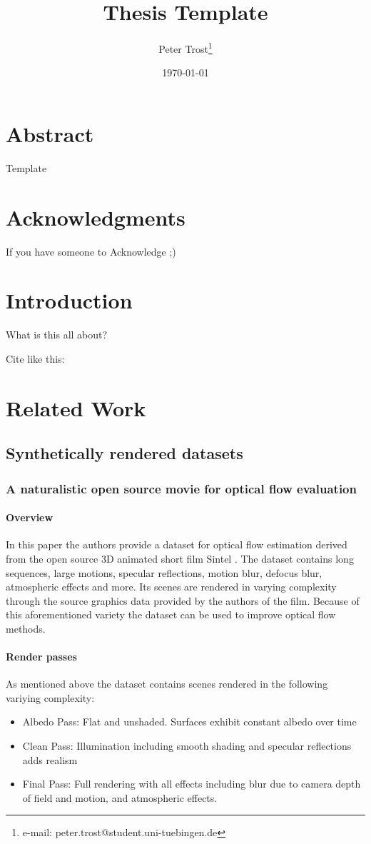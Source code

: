 \documentclass[a4paper,cleardoubleempty,BCOR1cm]{scrbook}
\title{Thesis Template}
\author{Peter Trost\thanks{e-mail: peter.trost@student.uni-tuebingen.de}}
\date{\today}
\begin{document}


\chapter*{Abstract}
Template

\chapter*{Acknowledgments}
If you have someone to Acknowledge ;)

\tableofcontents


\chapter{Introduction}
What is this all about?

Cite like this: \cite{agarwal2011}

\chapter{Related Work}
\section{Synthetically rendered datasets}
\subsection{A naturalistic open source movie for optical flow evaluation}
\cite{Butler:ECCV:2012}
\subsubsection{Overview}
In this paper the authors provide a dataset for optical flow estimation derived from the open source 3D animated short film Sintel
.
The dataset contains long sequences, large motions, specular reflections, motion blur, defocus blur, atmospheric effects and more. Its scenes are rendered in varying complexity through the source graphics data provided by the authors of the film. Because of this aforementioned variety the dataset can be used to improve optical flow methods. 

\subsubsection{Render passes}
As mentioned above the dataset contains scenes rendered in the following variying complexity:\\
\begin{itemize}
	\item Albedo Pass: Flat and unshaded. Surfaces exhibit constant albedo over time
	\item Clean Pass: Illumination including smooth shading and specular reflections adds realism
	\item Final Pass: Full rendering with all effects including blur due to camera depth of field and motion, and atmospheric effects.
\end{itemize}
\end{document}
